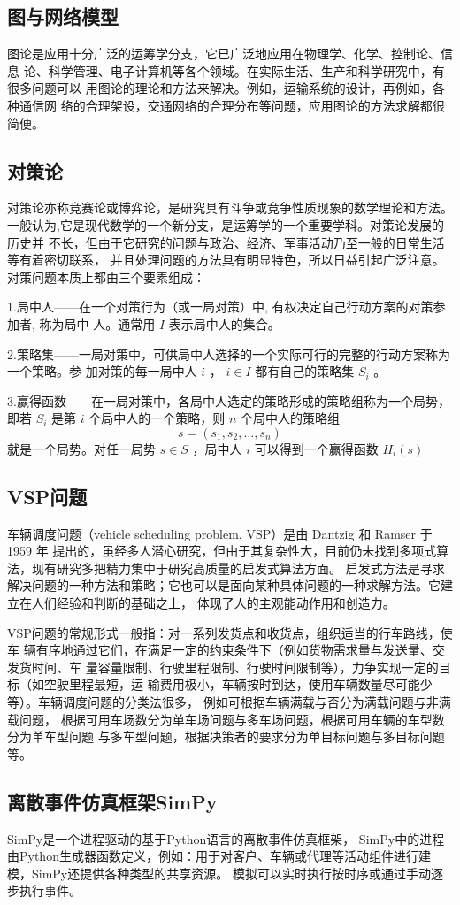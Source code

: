 \subsection{图与网络模型}
图论是应用十分广泛的运筹学分支，它已广泛地应用在物理学、化学、控制论、信息
论、科学管理、电子计算机等各个领域。在实际生活、生产和科学研究中，有很多问题可以
用图论的理论和方法来解决。例如，运输系统的设计，再例如，各种通信网
络的合理架设，交通网络的合理分布等问题，应用图论的方法求解都很简便\cite{gycx}。

\subsection{对策论}
对策论亦称竞赛论或博弈论，是研究具有斗争或竞争性质现象的数学理论和方法。
一般认为,它是现代数学的一个新分支，是运筹学的一个重要学科。对策论发展的历史并
不长，但由于它研究的问题与政治、经济、军事活动乃至一般的日常生活等有着密切联系，
并且处理问题的方法具有明显特色，所以日益引起广泛注意。
对策问题本质上都由三个要素组成：

1.局中人——在一个对策行为（或一局对策）中, 有权决定自己行动方案的对策参加者, 称为局中
人。通常用 $I$ 表示局中人的集合。

2.策略集——一局对策中，可供局中人选择的一个实际可行的完整的行动方案称为一个策略。参
加对策的每一局中人 $i$ ， $i \in I$ 都有自己的策略集 $S_i$ 。

3.赢得函数——在一局对策中，各局中人选定的策略形成的策略组称为一个局势，即若 $S_i$ 是第 $i$ 个局中人的一个策略，则 $n$ 个局中人的策略组
$$
s = \left(s_1,s_2,…,s_n\right)
$$
就是一个局势。对任一局势 $s \in S$ ，局中人 $i$ 可以得到一个赢得函数 $H_i(s)$

\subsection{VSP问题}
车辆调度问题（vehicle scheduling problem, VSP）是由 Dantzig 和 Ramser 于 1959 年
提出的，虽经多人潜心研究，但由于其复杂性大，目前仍未找到多项式算法，现有研究多把精力集中于研究高质量的启发式算法方面。
启发式方法是寻求解决问题的一种方法和策略；它也可以是面向某种具体问题的一种求解方法。它建立在人们经验和判断的基础之上，
体现了人的主观能动作用和创造力。

VSP问题的常规形式一般指：对一系列发货点和收货点，组织适当的行车路线，使车
辆有序地通过它们，在满足一定的约束条件下（例如货物需求量与发送量、交发货时间、车
量容量限制、行驶里程限制、行驶时间限制等），力争实现一定的目标（如空驶里程最短，运
输费用极小，车辆按时到达，使用车辆数量尽可能少等）。车辆调度问题的分类法很多，
例如可根据车辆满载与否分为满载问题与非满载问题，
根据可用车场数分为单车场问题与多车场问题，根据可用车辆的车型数分为单车型问题
与多车型问题，根据决策者的要求分为单目标问题与多目标问题等。


\subsection{离散事件仿真框架SimPy}
SimPy是一个进程驱动的基于Python语言的离散事件仿真框架，
SimPy中的进程由Python生成器函数定义，例如：用于对客户、车辆或代理等活动组件进行建模，SimPy还提供各种类型的共享资源。
模拟可以实时执行按时序或通过手动逐步执行事件。
